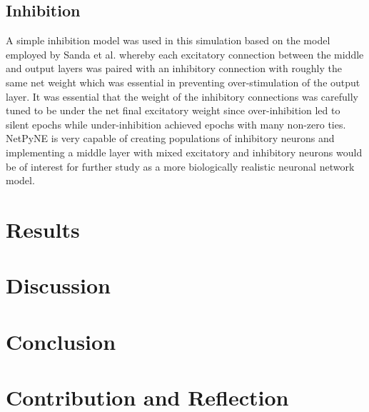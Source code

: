 \documentclass[11pt, twocolumn]{article}
\begin{document}
\subsection*{Inhibition}
A simple inhibition model was used in this simulation based on the model employed by Sanda et al. \cite{sanda2017multi} whereby each excitatory connection between the middle and output layers was paired with an inhibitory connection with roughly the same net weight which was essential in preventing over-stimulation of the output layer. It was essential that the weight of the inhibitory connections was carefully tuned to be under the net final excitatory weight since over-inhibition led to silent epochs while under-inhibition achieved epochs with many non-zero ties. \acs{NetPyNE} is very capable of creating populations of inhibitory neurons and implementing a middle layer with mixed excitatory and inhibitory neurons would be of interest for further study as a more biologically realistic neuronal network model.

\section*{Results}

\section*{Discussion}

\section*{Conclusion}

\printacronyms[name=Acronyms]
\printbibliography{}

\section*{Contribution and Reflection}
\end{document}

